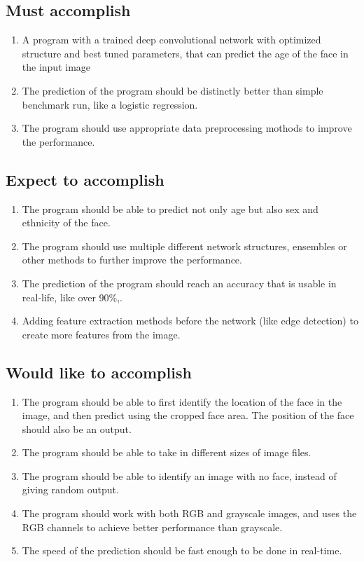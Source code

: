 \documentclass{article}
\begin{document}
\subsection{Must accomplish}

\begin{enumerate}
    \item A program with a trained deep convolutional network with optimized structure and best tuned parameters, that can predict the age of the face in the input image 
    \item The prediction of the program should be distinctly better than simple benchmark run, like a logistic regression.
    \item The program should use appropriate data preprocessing mothods to improve the performance.
\end{enumerate}

\subsection{Expect to accomplish}

\begin{enumerate}
    \item The program should be able to predict not only age but also sex and ethnicity of the face.
    \item The program should use multiple different network structures, ensembles or other methods to further improve the performance.
    \item The prediction of the program should reach an accuracy that is usable in real-life, like over 90\%,. 
    \item Adding feature extraction methods before the network (like edge detection) to create more features from the image.
\end{enumerate}

\subsection{Would like to accomplish}

\begin{enumerate}
    \item The program should be able to first identify the location of the face in the image, and then predict using the cropped face area. The position of the face should also be an output.
    \item The program should be able to take in different sizes of image files.
    \item The program should be able to identify an image with no face, instead of giving random output.
    \item The program should work with both RGB and grayscale images, and uses the RGB channels to achieve better performance than grayscale.
    \item The speed of the prediction should be fast enough to be done in real-time.
\end{enumerate}
\end{document}
